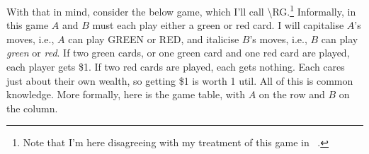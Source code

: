 With that in mind, consider the below game, which I'll call \textbackslash{}RG.\footnote{Note that I'm here disagreeing with my treatment of this game in ~\citep{Weatherson2012-WEAGAT}.} Informally, in this game $A$ and $B$ must each play either a green or red card. I will capitalise $A$'s moves, i.e., $A$ can play GREEN or RED, and italicise $B$'s moves, i.e., $B$ can play \emph{green} or \emph{red}. If two green cards, or one green card and one red card are played, each player gets \$1. If two red cards are played, each gets nothing. Each cares just about their own wealth, so getting \$1 is worth 1 util. All of this is common knowledge. More formally, here is the game table, with $A$ on the row and $B$ on the column.
